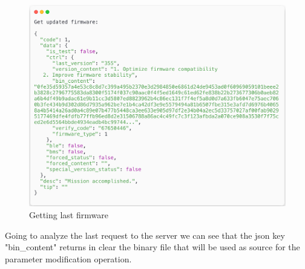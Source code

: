 \documentclass[binding=0.6cm,LaM,noexaminfo]{sapthesis}
\begin{document}
\begin{figure}[!htp]
    \centering
    \includegraphics[width = .9\textwidth]{images/sniff3.png}
    \caption{Getting last firmware}
    \label{fig:my_label}
\end{figure}

\noindent Going to analyze the last request to the server we can see that the json key "bin\_content" returns in clear the binary file that will be used as source for the parameter modification operation.
\end{document}
